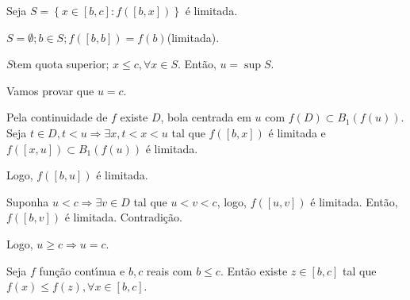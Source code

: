 \documentclass{book}
\begin{document}
\begin{dem}

Seja $S = \left\{ {x \in \left[ {b,c} \right]:f\left( {\left[ {b,x} \right]}
\right)} \right\}$ \'{e} limitada.

$S = \emptyset ;b \in S;f\left( {\left[ {b,b} \right]} \right) = f\left( b
\right)$(limitada).

$S$tem quota superior; $x \leqslant c,\forall x \in S$. Ent\~ao, $u = \sup
S$.

Vamos provar que $u = c$.

Pela continuidade de $f$ existe $D$, bola centrada em $u$ com $f\left( D
\right) \subset B_1 \left( {f\left( u \right)} \right)$. Seja $t \in D,t <
u \Rightarrow \exists x,t < x < u$ tal que $f\left( {\left[ {b,x} \right]}
\right)$ \'{e} limitada e $f\left( {\left[ {x,u} \right]} \right) \subset
B_1 \left( {f\left( u \right)} \right)$ \'{e} limitada.

Logo, $f\left( {\left[ {b,u} \right]} \right)$ \'{e} limitada.

Suponha $u < c \Rightarrow \exists v \in D$ tal que $u < v < c$, logo,
$f\left( {\left[ {u,v} \right]} \right)$ \'{e} limitada. Ent\~ao, $f\left(
{\left[ {b,v} \right]} \right)$ \'{e} limitada. Contradi\c c\~ao.

Logo, $u \geqslant c \Rightarrow u = c$.

\end{dem}

\begin{teo}
\label{t2}

Seja $f$ fun\c c\~ao cont\'{\i}nua e $b,c$ reais com $b \leqslant c$.
Ent\~ao existe $z \in \left[ {b,c} \right]$ tal que $f\left( x \right)
\leqslant f\left( z \right),\forall x \in \left[ {b,c} \right]$.

\end{teo}
\end{document}
